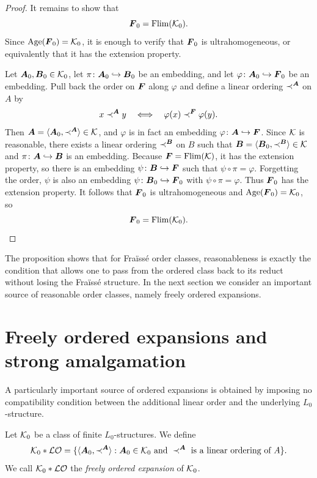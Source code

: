 \begin{proof}
    It remains to show that
    \[
        \boldsymbol{F}_0=\operatorname{Flim}(\mathcal{K}_0).
    \]
    Since \(\operatorname{Age}(\boldsymbol{F}_0)=\mathcal{K}_0\),
    it is enough to verify that \(\boldsymbol{F}_0\) is ultrahomogeneous, or equivalently that it has the extension property.

    Let \(\boldsymbol{A}_0,\boldsymbol{B}_0\in\mathcal{K}_0\), let \(\pi\colon \boldsymbol{A}_0\hookrightarrow \boldsymbol{B}_0\) be an embedding, and let \(\varphi\colon \boldsymbol{A}_0\hookrightarrow \boldsymbol{F}_0\) be an embedding. Pull back the order on \(\boldsymbol{F}\) along \(\varphi\) and define a linear ordering \(\prec^{\boldsymbol{A}}\) on \(A\) by
    \[
        x\prec^{\boldsymbol{A}} y
        \quad\Longleftrightarrow\quad
        \varphi(x)\prec^{\boldsymbol{F}}\varphi(y).
    \]
    Then \(\boldsymbol{A}=\langle \boldsymbol{A}_0,\prec^{\boldsymbol{A}}\rangle\in\mathcal{K}\), and \(\varphi\) is in fact an embedding \(\varphi\colon \boldsymbol{A}\hookrightarrow \boldsymbol{F}\).
    Since \(\mathcal{K}\) is reasonable, there exists a linear ordering \(\prec^{\boldsymbol{B}}\) on \(B\) such that \(\boldsymbol{B}=\langle \boldsymbol{B}_0,\prec^{\boldsymbol{B}}\rangle\in\mathcal{K}\) and \(\pi\colon \boldsymbol{A}\hookrightarrow \boldsymbol{B}\) is an embedding. Because \(\boldsymbol{F}=\operatorname{Flim}(\mathcal{K})\), it has the extension property, so there is an embedding \(\psi\colon \boldsymbol{B}\hookrightarrow \boldsymbol{F}\) such that \(\psi\circ\pi=\varphi\). Forgetting the order, \(\psi\) is also an embedding \(\psi\colon \boldsymbol{B}_0\hookrightarrow \boldsymbol{F}_0\) with \(\psi\circ\pi=\varphi\).
    Thus \(\boldsymbol{F}_0\) has the extension property. It follows that \(\boldsymbol{F}_0\) is ultrahomogeneous and \(\operatorname{Age}(\boldsymbol{F}_0)=\mathcal{K}_0\),
    so
    \[
        \boldsymbol{F}_0=\operatorname{Flim}(\mathcal{K}_0).
    \]
\end{proof}
The proposition shows that for Fraïssé order classes, reasonableness is exactly the condition that allows one to pass from the ordered class back to its reduct without losing the Fraïssé structure. In the next section we consider an important source of reasonable order classes, namely freely ordered expansions.



\section[Freely ordered expansions and strong amalgamation]{Freely ordered expansions and\\strong amalgamation}

A particularly important source of ordered expansions is obtained by imposing no compatibility condition between the additional linear order and the underlying \(L_0\)-structure.

\begin{definition}
    Let \(\mathcal{K}_0\) be a class of finite \(L_0\)-structures. We define
    \[
        \mathcal{K}_0 * \mathcal{LO}
        =
        \{\langle \boldsymbol{A}_0,\prec^{\boldsymbol{A}}\rangle : \boldsymbol{A}_0\in\mathcal{K}_0 \text{ and } \prec^{\boldsymbol{A}} \text{ is a linear ordering of } A\}.
    \]
    We call \(\mathcal{K}_0 * \mathcal{LO}\) the \emph{freely ordered expansion} of \(\mathcal{K}_0\).
\end{definition}

